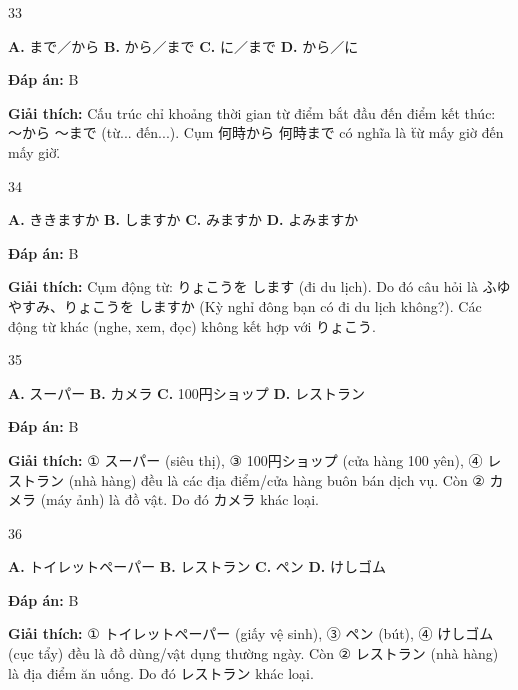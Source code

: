 \documentclass[12pt,a4paper]{report}
\newcommand{\source}[1]{}
\newcommand{\choice}[2]{\textbf{#1.} #2 \quad}
\newcommand{\answer}[1]{\par\textbf{Đáp án:} #1}
\newcommand{\confidence}[1]{}
\newcommand{\explain}[1]{\par\textbf{Giải thích:} #1\vspace{0.5cm}}
\begin{document}
\begin{question}{33}
\source{Q21.jpg}
\choice{A}{まで／から}
\choice{B}{から／まで}
\choice{C}{に／まで}
\choice{D}{から／に}
\answer{B}
\confidence{high}
\explain{Cấu trúc chỉ khoảng thời gian từ điểm bắt đầu đến điểm kết thúc: ～から ～まで (từ... đến...). Cụm 何時から 何時まで có nghĩa là \"từ mấy giờ đến mấy giờ\".}
\end{question}

\begin{question}{34}
\source{Q22.jpg}
\choice{A}{ききますか}
\choice{B}{しますか}
\choice{C}{みますか}
\choice{D}{よみますか}
\answer{B}
\confidence{high}
\explain{Cụm động từ: りょこうを します (đi du lịch). Do đó câu hỏi là ふゆやすみ、りょこうを しますか (Kỳ nghỉ đông bạn có đi du lịch không?). Các động từ khác (nghe, xem, đọc) không kết hợp với りょこう.}
\end{question}

\begin{question}{35}
\source{Q23.jpg}
\choice{A}{スーパー}
\choice{B}{カメラ}
\choice{C}{100円ショップ}
\choice{D}{レストラン}
\answer{B}
\confidence{high}
\explain{① スーパー (siêu thị), ③ 100円ショップ (cửa hàng 100 yên), ④ レストラン (nhà hàng) đều là các địa điểm/cửa hàng buôn bán dịch vụ. Còn ② カメラ (máy ảnh) là đồ vật. Do đó カメラ khác loại.}
\end{question}

\begin{question}{36}
\source{Q24.jpg}
\choice{A}{トイレットペーパー}
\choice{B}{レストラン}
\choice{C}{ペン}
\choice{D}{けしゴム}
\answer{B}
\confidence{high}
\explain{① トイレットペーパー (giấy vệ sinh), ③ ペン (bút), ④ けしゴム (cục tẩy) đều là đồ dùng/vật dụng thường ngày. Còn ② レストラン (nhà hàng) là địa điểm ăn uống. Do đó レストラン khác loại.}
\end{question}
\end{document}
